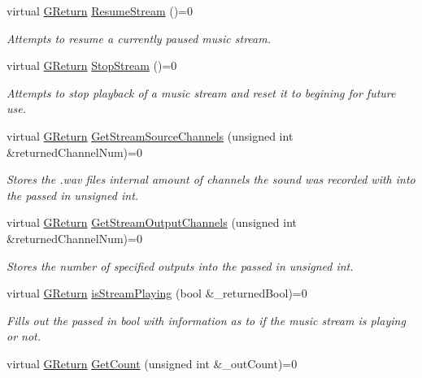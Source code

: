 \begin{DoxyCompactItemize}
virtual \hyperlink{namespaceGW_a67a839e3df7ea8a5c5686613a7a3de21}{G\+Return} \hyperlink{classGW_1_1AUDIO_1_1GMusic_a56cc4db5fab860fdb948630b821bcdbd}{Resume\+Stream} ()=0
\begin{DoxyCompactList}\small\item\em Attempts to resume a currently paused music stream. \end{DoxyCompactList}\item 
virtual \hyperlink{namespaceGW_a67a839e3df7ea8a5c5686613a7a3de21}{G\+Return} \hyperlink{classGW_1_1AUDIO_1_1GMusic_a7d0ecd391a9723426dd3a24df7db1ad8}{Stop\+Stream} ()=0
\begin{DoxyCompactList}\small\item\em Attempts to stop playback of a music stream and reset it to begining for future use. \end{DoxyCompactList}\item 
virtual \hyperlink{namespaceGW_a67a839e3df7ea8a5c5686613a7a3de21}{G\+Return} \hyperlink{classGW_1_1AUDIO_1_1GMusic_aef10f15b8487e18c2d65d1666ba64662}{Get\+Stream\+Source\+Channels} (unsigned int \&returned\+Channel\+Num)=0
\begin{DoxyCompactList}\small\item\em Stores the .wav files internal amount of channels the sound was recorded with into the passed in unsigned int. \end{DoxyCompactList}\item 
virtual \hyperlink{namespaceGW_a67a839e3df7ea8a5c5686613a7a3de21}{G\+Return} \hyperlink{classGW_1_1AUDIO_1_1GMusic_a750dcb654e813c322d7617e1a5ebdf93}{Get\+Stream\+Output\+Channels} (unsigned int \&returned\+Channel\+Num)=0
\begin{DoxyCompactList}\small\item\em Stores the number of specified outputs into the passed in unsigned int. \end{DoxyCompactList}\item 
virtual \hyperlink{namespaceGW_a67a839e3df7ea8a5c5686613a7a3de21}{G\+Return} \hyperlink{classGW_1_1AUDIO_1_1GMusic_a0a0f4d5e0d11f7aec7ed9a1a6371df1a}{is\+Stream\+Playing} (bool \&\+\_\+returned\+Bool)=0
\begin{DoxyCompactList}\small\item\em Fills out the passed in bool with information as to if the music stream is playing or not. \end{DoxyCompactList}\item 
virtual \hyperlink{namespaceGW_a67a839e3df7ea8a5c5686613a7a3de21}{G\+Return} \hyperlink{classGW_1_1AUDIO_1_1GMusic_ae41f54531b8325848215596fb2f821ac}{Get\+Count} (unsigned int \&\+\_\+out\+Count)=0

\end{DoxyCompactItemize}
